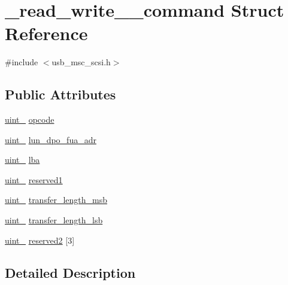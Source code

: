 \hypertarget{struct__read__write__10__command}{}\section{\+\_\+read\+\_\+write\+\_\+\_\+command Struct Reference}
\label{struct__read__write__10__command}


{\ttfamily \#include $<$usb\+\_\+msc\+\_\+scsi.\+h$>$}

\subsection*{Public Attributes}
\begin{DoxyCompactItemize}
\item 
\hyperlink{types_8h_ad3209046c23f739a81581c10a4be7d92}{uint\+\_} \hyperlink{struct__read__write__10__command_aeb34b94d6270a9e710359de8cd2a0091}{opcode}
\item 
\hyperlink{types_8h_ad3209046c23f739a81581c10a4be7d92}{uint\+\_} \hyperlink{struct__read__write__10__command_abef755e80dc0f4bcad6559e56891bb33}{lun\+\_\+dpo\+\_\+fua\+\_\+adr}
\item 
\hyperlink{types_8h_a5532400b872b4aa84e54335bf458a318}{uint\+\_} \hyperlink{struct__read__write__10__command_aa4c29706bfb663043403f8b28a1d32d1}{lba}
\item 
\hyperlink{types_8h_ad3209046c23f739a81581c10a4be7d92}{uint\+\_} \hyperlink{struct__read__write__10__command_af79f0a3d1a8908e4e17ee47a7a121876}{reserved1}
\item 
\hyperlink{types_8h_ad3209046c23f739a81581c10a4be7d92}{uint\+\_} \hyperlink{struct__read__write__10__command_a39c3facff5ffc432a58fad8154a3765e}{transfer\+\_\+length\+\_\+msb}
\item 
\hyperlink{types_8h_ad3209046c23f739a81581c10a4be7d92}{uint\+\_} \hyperlink{struct__read__write__10__command_a53389ce2784140f7ee172cf043aa6048}{transfer\+\_\+length\+\_\+lsb}
\item 
\hyperlink{types_8h_ad3209046c23f739a81581c10a4be7d92}{uint\+\_} \hyperlink{struct__read__write__10__command_a8618e238961a8c76603b6d3ece4e49c6}{reserved2} \mbox{[}3\mbox{]}
\end{DoxyCompactItemize}


\subsection{Detailed Description}


